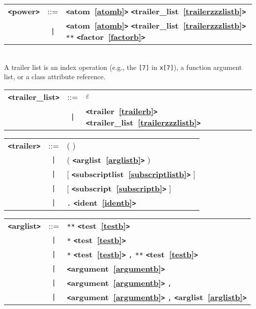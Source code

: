 \label{powerb}
\begin{tabular}{lcl}
{\bf \verb+<+power\verb+>+} & ::=  & {\bf \verb+<+atom~\ref{atomb}\verb+>+}  {\bf \verb+<+trailer\_list~\ref{trailerzzzlistb}\verb+>+}  \\
 & \verb+|+  & {\bf \verb+<+atom~\ref{atomb}\verb+>+}  {\bf \verb+<+trailer\_list~\ref{trailerzzzlistb}\verb+>+}  \verb|**| {\bf \verb+<+factor~\ref{factorb}\verb+>+}  \\
\end{tabular} \\

A trailer list is an index operation (e.g., the \verb|[7]| in \verb|x[7]|), a function argument list, or a class attribute reference.

\label{trailerzzzlistb}
\begin{tabular}{lcl}
{\bf \verb+<+trailer\_list\verb+>+} & ::=  & $\varepsilon$ \\
 & \verb+|+  & {\bf \verb+<+trailer~\ref{trailerb}\verb+>+}  {\bf \verb+<+trailer\_list~\ref{trailerzzzlistb}\verb+>+}  \\
\end{tabular}

\label{trailerb}
\begin{tabular}{lcl}
{\bf \verb+<+trailer\verb+>+} & ::=  & ( ) \\
 & \verb+|+  & ( {\bf \verb+<+arglist~\ref{arglistb}\verb+>+}  ) \\
 & \verb+|+  & [ {\bf \verb+<+subscriptlist~\ref{subscriptlistb}\verb+>+}  ] \\
 & \verb+|+  & [ {\bf \verb+<+subscript~\ref{subscriptb}\verb+>+}  ] \\
 & \verb+|+  & \verb|.| {\bf \verb+<+ident~\ref{identb}\verb+>+}  \\
\end{tabular}

\label{arglistb}
\begin{tabular}{lcl}
{\bf \verb+<+arglist\verb+>+} & ::=  & \verb|**| {\bf \verb+<+test~\ref{testb}\verb+>+}  \\
 & \verb+|+  & \verb|*| {\bf \verb+<+test~\ref{testb}\verb+>+}  \\
 & \verb+|+  & \verb|*| {\bf \verb+<+test~\ref{testb}\verb+>+}  \verb|,| \verb|**| {\bf \verb+<+test~\ref{testb}\verb+>+}  \\
 & \verb+|+  & {\bf \verb+<+argument~\ref{argumentb}\verb+>+}  \\
 & \verb+|+  & {\bf \verb+<+argument~\ref{argumentb}\verb+>+}  \verb|,| \\
 & \verb+|+  & {\bf \verb+<+argument~\ref{argumentb}\verb+>+}  \verb|,| {\bf \verb+<+arglist~\ref{arglistb}\verb+>+}  \\
\end{tabular}

